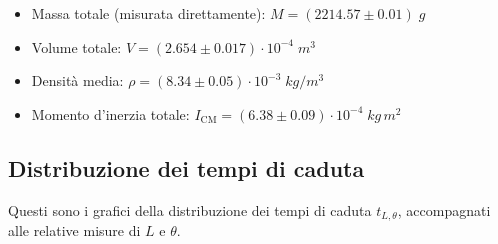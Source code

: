 \documentclass{article}
\begin{document}
\begin{itemize}
    \item Massa totale (misurata direttamente): $M=(2214.57\pm0.01)\;\unit{g}$
    \item Volume totale: $V=(2.654\pm0.017)\cdot10^{-4}\;\unit{m^3}$
    \item Densità media: $\rho=(8.34\pm0.05)\cdot10^{-3}\;\unit{kg \per m^3}$
    \item Momento d'inerzia totale: $I_\text{CM}=(6.38\pm0.09)\cdot10^{-4}\;\unit{kg\,m^2}$
\end{itemize}


\subsection{Distribuzione dei tempi di caduta}

Questi sono i grafici della distribuzione dei tempi di caduta $t_{L,\theta}$,
accompagnati alle relative misure di $L$ e $\theta$.
\end{document}
